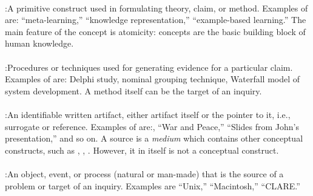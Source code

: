 \paragraph{}

\noindent{}:\hspace{.2in}A primitive construct used in
formulating theory, claim, or method. Examples of 
are: ``meta-learning,'' ``knowledge representation,'' ``example-based
learning.'' The main feature of the concept is atomicity: concepts are the
basic building block of human knowledge.

\paragraph{}

\noindent{}:\hspace{.2in}Procedures or techniques used for
generating evidence for a particular claim. Examples of  are: Delphi study, nominal grouping technique, Waterfall model
of system development. A method itself can be the target of an inquiry.

\paragraph{}

\noindent{}:\hspace{.2in}An identifiable written artifact,
either artifact itself or the pointer to it, i.e., surrogate or reference.
Examples of  are:, ``War and Peace,'' ``Slides from
John's presentation,'' and so on.  A source is a {\it medium\/} which
contains other conceptual constructs, such as ,
, . However,  it in itself is not a conceptual construct.

\paragraph{}

\noindent{}:\hspace{.2in}An object, event, or process
(natural or man-made) that is the source of a problem or target of an
inquiry. Examples are ``Unix,'' ``Macintosh,'' ``CLARE.''

\paragraph{}

